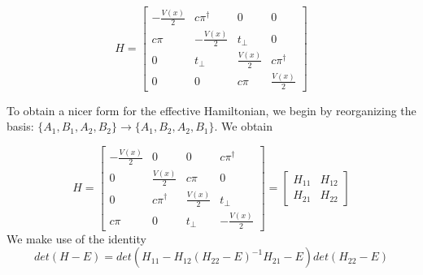 \documentclass{article}
\begin{document}
\begin{equation}
H =
\begin{bmatrix}
-\frac{V(x)}{2}  & c\pi^{\dagger} & 0 & 0\\
c\pi & -\frac{V(x)}{2}  & t_{\perp} & 0 \\
0 & t_{\perp} & \frac{V(x)}{2}  & c\pi^{\dagger} \\
0 & 0 & c\pi & \frac{V(x)}{2}
\end{bmatrix}
\end{equation}


To obtain a nicer form for the effective Hamiltonian,
we begin by reorganizing the basis: $\{A_{1}, B_{1}, A_{2}, B_{2}\} \rightarrow \{A_{1}, B_{2}, A_{2}, B_{1}\}$. We obtain

\begin{equation}
H =
\begin{bmatrix}
-\frac{V(x)}{2} & 0 & 0 & c\pi^{\dagger}\\
0& \frac{V(x)}{2}  & c\pi & 0 \\
0 & c\pi^{\dagger}  & \frac{V(x)}{2}  & t_{\perp} \\
c\pi & 0 & t_{\perp} & -\frac{V(x)}{2}
\end{bmatrix} =
\begin{bmatrix}
H_{11} & H_{12} \\
H_{21} & H_{22}
\end{bmatrix}
\end{equation}
We make use of the identity
\begin{equation}
det(H - E) = det(H_{11} - H_{12}(H_{22} - E)^{-1}H_{21} - E)det(H_{22} - E)
\end{equation}
\end{document}
